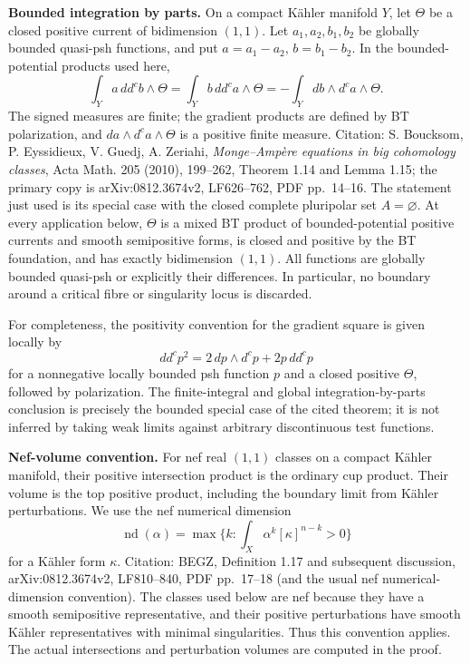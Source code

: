 \documentclass[
  11pt,
]{article}
\begin{document}
\textbf{Bounded integration by parts.} On a compact Kähler manifold
\(Y\), let \(\Theta\) be a closed positive current of bidimension
\((1,1)\). Let \(a_1,a_2,b_1,b_2\) be globally bounded quasi-psh
functions, and put \(a=a_1-a_2\), \(b=b_1-b_2\). In the
bounded-potential products used here, \[\int_Y a\,dd^cb\wedge\Theta
=\int_Y b\,dd^ca\wedge\Theta
=-\int_Y db\wedge d^ca\wedge\Theta. \tag{IBP}\] The signed measures are
finite; the gradient products are defined by BT polarization, and
\(da\wedge d^ca\wedge\Theta\) is a positive finite measure. Citation: S.
Boucksom, P. Eyssidieux, V. Guedj, A. Zeriahi, \emph{Monge--Ampère
equations in big cohomology classes}, Acta Math. 205 (2010), 199--262,
Theorem 1.14 and Lemma 1.15; the primary copy is arXiv:0812.3674v2,
LF626--762, PDF pp.~14--16. The statement just used is its special case
with the closed complete pluripolar set \(A=\varnothing\). At every
application below, \(\Theta\) is a mixed BT product of bounded-potential
positive currents and smooth semipositive forms, is closed and positive
by the BT foundation, and has exactly bidimension \((1,1)\). All
functions are globally bounded quasi-psh or explicitly their
differences. In particular, no boundary around a critical fibre or
singularity locus is discarded.

For completeness, the positivity convention for the gradient square is
given locally by \[dd^c p^2=2\,dp\wedge d^cp+2p\,dd^cp\] for a
nonnegative locally bounded psh function \(p\) and a closed positive
\(\Theta\), followed by polarization. The finite-integral and global
integration-by-parts conclusion is precisely the bounded special case of
the cited theorem; it is not inferred by taking weak limits against
arbitrary discontinuous test functions.

\textbf{Nef-volume convention.} For nef real \((1,1)\) classes on a
compact Kähler manifold, their positive intersection product is the
ordinary cup product. Their volume is the top positive product,
including the boundary limit from Kähler perturbations. We use the nef
numerical dimension
\[\operatorname{nd}(\alpha)=\max\{k:\int_X\alpha^k[\kappa]^{n-k}>0\}\]
for a Kähler form \(\kappa\). Citation: BEGZ, Definition 1.17 and
subsequent discussion, arXiv:0812.3674v2, LF810--840, PDF pp.~17--18
(and the usual nef numerical-dimension convention). The classes used
below are nef because they have a smooth semipositive representative,
and their positive perturbations have smooth Kähler representatives with
minimal singularities. Thus this convention applies. The actual
intersections and perturbation volumes are computed in the proof.
\end{document}
